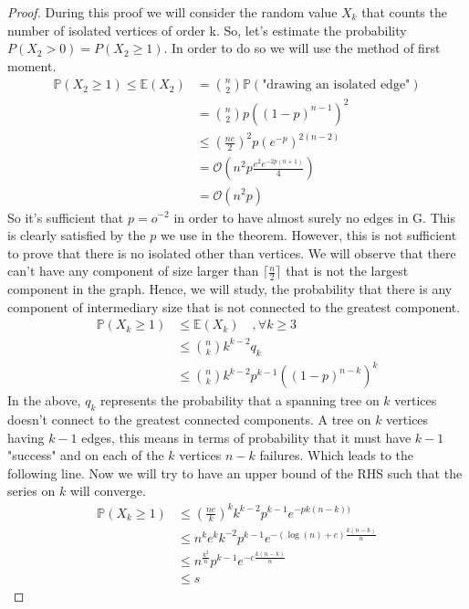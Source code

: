\begin{proof}
During this proof we will consider the random value $X_k$ that counts the number of isolated vertices of order k.
So, let's estimate the probability $P(X_2 > 0) = P(X_2 \geq 1 )$. In order to do so we will use the method of first moment.
\begin{align}
	\mathbb{P}(X_2 \geq 1) \leq \mathbb{E}(X_2) 	&= \binom{n}{2}\mathbb{P}(\text{"drawing an isolated edge"}) \\
						    	&= \binom{n}{2}p((1-p)^{n-1})^2 \\
							&\leq (\frac{ne}{2})^2p(e^{-p})^{2(n-2)} \\
						    	&= \mathcal{O}\left(n^2p \frac{ e^2 e^{-2p(n+1)} }{4}\right) \\
							&= \mathcal{O}(n^2p)
\end{align}
So it's sufficient that $p = o^{-2}$ in order to have almost surely no edges in G. This is clearly satisfied by the $p$ we use in the theorem.
\newline
However, this is not sufficient to prove that there is no isolated other than vertices. We will observe that there can't have any component of size larger than $\lceil \frac{n}{2} \rceil$ that is not the largest component in the graph.
Hence, we will study, the probability that there is any component of intermediary size that is not connected to the greatest component.
\begin{align}
	\mathbb{P}(X_k \geq 1) &\leq \mathbb{E}(X_k)\quad, \forall k \geq 3 \\
				&\leq \binom{n}{k} k^{k-2} q_k\\
				&\leq \binom{n}{k} k^{k-2} p^{k-1} ((1-p)^{n-k})^k
\end{align}
In the above, $q_k$ represents the probability that a spanning tree on $k$ vertices doesn't connect to the greatest connected components. A tree on $k$ vertices having $k-1$ edges, this means in terms of probability that it must have $k-1$ "success" and on each of the $k$ vertices $n-k$ failures. Which leads to the following line.
\newline 
Now we will try to have an upper bound of the RHS such that the series on $k$ will converge.
\begin{align}
	\mathbb{P}(X_k \geq 1) 	&\leq (\frac{ne}{k})^k k^{k-2} p^{k-1} e^{-pk(n-k))}\\
				&\leq n^ke^kk^{-2} p^{k-1}e^{-(\log(n) + c)\frac{k(n-k)}{n}}\\
				&\leq n^\frac{k^2}{n} p^{k-1}e^{-c\frac{k(n-k)}{n}}\\
				&\leq s
\end{align}

\end{proof}
